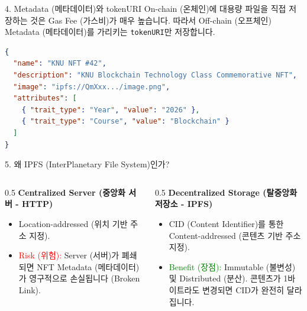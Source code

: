 \documentclass[aspectratio=169]{beamer}
\begin{document}
\begin{frame}[fragile]{4. Metadata (메타데이터)와 tokenURI}
    On-chain (온체인)에 대용량 파일을 직접 저장하는 것은 Gas Fee (가스비)가 매우 높습니다. 따라서 Off-chain (오프체인) Metadata (메타데이터)를 가리키는 \texttt{tokenURI}만 저장합니다.

    \vspace{0.3cm}
    \begin{lstlisting}[language=json, caption={Standard Metadata JSON}]
{
  "name": "KNU NFT #42",
  "description": "KNU Blockchain Technology Class Commemorative NFT",
  "image": "ipfs://QmXxx.../image.png",
  "attributes": [
    { "trait_type": "Year", "value": "2026" },
    { "trait_type": "Course", "value": "Blockchain" }
  ]
}
    \end{lstlisting}
\end{frame}

\begin{frame}{5. 왜 IPFS (InterPlanetary File System)인가?}
    \begin{columns}
        \begin{column}{0.5\textwidth}
            \textbf{Centralized Server (중앙화 서버 - HTTP)}
            \begin{itemize}
                \item Location-addressed (위치 기반 주소 지정).
                \item \textcolor{red}{Risk (위험):} Server (서버)가 폐쇄되면 NFT Metadata (메타데이터)가 영구적으로 손실됩니다 (Broken Link).
            \end{itemize}
        \end{column}
        \begin{column}{0.5\textwidth}
            \textbf{Decentralized Storage (탈중앙화 저장소 - IPFS)}
            \begin{itemize}
                \item CID (Content Identifier)를 통한 Content-addressed (콘텐츠 기반 주소 지정).
                \item \textcolor{green}{Benefit (장점):} Immutable (불변성) 및 Distributed (분산). 콘텐츠가 1바이트라도 변경되면 CID가 완전히 달라집니다.
            \end{itemize}
        \end{column}
    \end{columns}
\end{frame}
\end{document}
